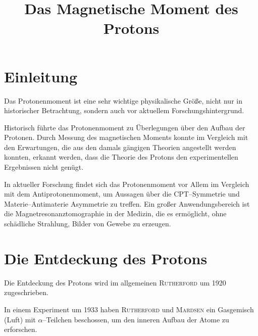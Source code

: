 \documentclass[sn-mathphys-num,iicol]{sn-jnl}
\theoremstyle{thmstyleone}
\theoremstyle{thmstyletwo}
\theoremstyle{thmstylethree}
\begin{document}
        
\title[Title]{Das Magnetische Moment des Protons}
\author*[1]{ }


\maketitle

\section{Einleitung}
Das Protonenmoment ist eine sehr wichtige physikalische Größe, nicht nur in historischer Betrachtung, sondern auch vor aktuellem Forschungshintergrund.

Historisch führte das Protonenmoment zu Überlegungen über den Aufbau der Protonen.
Durch Messung des magnetischen Moments konnte im Vergleich mit den Erwartungen, die aus den damals gängigen Theorien angestellt werden konnten, erkannt werden, dass die Theorie des Protons den experimentellen Ergebnissen nicht genügt.

In aktueller Forschung findet sich das Protonenmoment vor Allem im Vergleich mit dem Antiprotonenmoment, um Aussagen über die CPT--Symmetrie und Materie--Antimaterie Asymmetrie zu treffen.
Ein großer Anwendungsbereich ist die Magnetresonanztomographie in der Medizin, die es ermöglicht, ohne schädliche Strahlung, Bilder von Gewebe zu erzeugen.

\section{Die Entdeckung des Protons}
Die Entdeckung des Protons wird im allgemeinen \textsc{Rutherford} um 1920 zugeschrieben.

In einem Experiment um 1933 haben \textsc{Rutherford} und \textsc{Mardsen} ein Gasgemisch (Luft) mit $\alpha $--Teilchen beschossen, um den inneren Aufbau der Atome zu erforschen.
\end{document}

